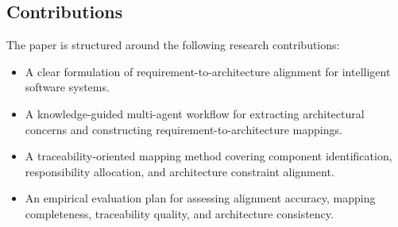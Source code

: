 \subsection{Contributions}
\label{sec:intro-contributions}

The paper is structured around the following research contributions:
\begin{itemize}[leftmargin=*]
  \item A clear formulation of requirement-to-architecture alignment for intelligent software systems.
  \item A knowledge-guided multi-agent workflow for extracting architectural concerns and constructing requirement-to-architecture mappings.
  \item A traceability-oriented mapping method covering component identification, responsibility allocation, and architecture constraint alignment.
  \item An empirical evaluation plan for assessing alignment accuracy, mapping completeness, traceability quality, and architecture consistency.
\end{itemize}
